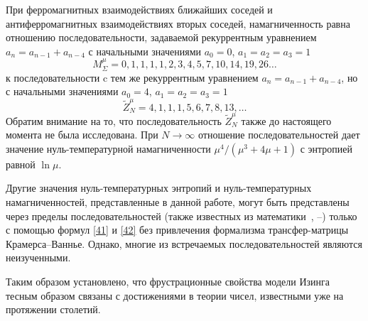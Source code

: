 
При ферромагнитных взаимодействиях ближайших соседей и антиферромагнитных взаимодействиях вторых соседей, намагниченность равна отношению последовательности, задаваемой рекуррентным уравнением $a_n = a_{n-1} + a_{n-4}$ с начальными значениями $a_0 = 0$, $a_1 = a_2 = a_3 = 1$ \[M^{\mu}_{\Sigma} = 0, 1, 1, 1, 1, 2, 3, 4, 5, 7, 10, 14, 19, 26 \dots\] к последовательности c тем же рекуррентным уравнением $a_n = a_{n-1} + a_{n-4}$, но с начальными значениями $a_0 = 4$, $a_1 = a_2 = a_3 = 1$ \[\widetilde{Z}^{\mu}_{N} = 4, 1, 1, 1, 5, 6, 7, 8, 13, \dots\] Обратим внимание на то, что последовательность $\widetilde{Z}^{\mu}_{N}$ также до настоящего момента не была исследована.
При $N\rightarrow \infty$ отношение последовательностей дает значение нуль-температурной намагниченности $\mu^4/(\mu^3+4\mu+1)$ с энтропией равной $\ln \mu$.

Другие значения нуль-температурных энтропий и нуль-температурных намагниченностей, представленные в данной работе, могут быть представлены через пределы последовательностей (также известных из математики~\cite{sloane1973, sloane1995}, \cite{bicknell1975}--\cite{adams1982}) только с помощью формул \eqref{41} и \eqref{42} без привлечения формализма трансфер-матрицы Крамерса--Ваннье. Однако, многие из встречаемых последовательностей являются неизученными.

Таким образом установлено, что фрустрационные свойства модели Изинга тесным образом связаны с достижениями в теории чисел, известными уже на протяжении столетий.

\clearpage